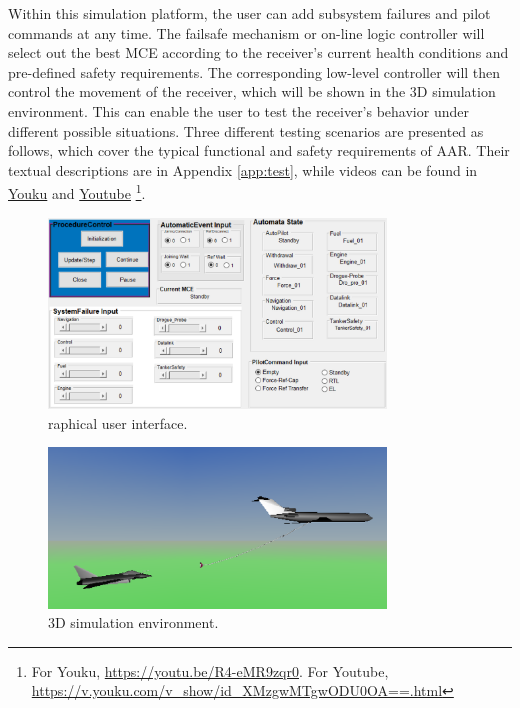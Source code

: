 Within this simulation platform, the user can add subsystem failures and pilot commands at any time. The failsafe mechanism or on-line logic controller will select out the best MCE according to the receiver's current health conditions and pre-defined safety requirements. The corresponding low-level controller will then control the movement of the receiver, which will be shown in the 3D simulation environment. This can enable the user to test the receiver's behavior under different possible situations. Three different testing scenarios are presented as follows, which cover the typical functional and safety requirements of AAR. Their textual descriptions are in Appendix \ref{app:test}, while videos can be found in \href{https://v.youku.com/v_show/id_XMzcwOTI0MDI4MA==.html?spm=a2h3j.8428770.3416059.1}{Youku} and \href{https://www.youtube.com/watch?v=PWLZffiGBoU&frags=pl\%2Cwn}{Youtube}
\footnote{For Youku, \url{https://youtu.be/R4-eMR9zqr0}. For Youtube, \url{ https://v.youku.com/v_show/id_XMzgwMTgwODU0OA==.html} }.
\begin{figure}[h]
	\begin{center}
		\includegraphics[width=0.8\textwidth]{Figures/Figs_Ch14/Fig24a_GUI}
		\par\end{center}
	\caption{raphical user interface.}
	\label{fig:gui} 
\end{figure}

\begin{figure}[h]
	\begin{center}
		\includegraphics[width=0.8\textwidth]{Figures/Figs_Ch14/Fig24b_VR}
		\par\end{center}
	\caption{3D simulation environment.}
	\label{fig:vr} 
\end{figure}


